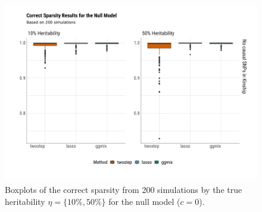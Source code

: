 \documentclass[12pt,letter]{article}\usepackage[]{graphicx}\usepackage[]{color}
\newenvironment{knitrout}{}{} %
\begin{document}
\begin{knitrout}\scriptsize
{}\color{fgcolor}\begin{figure}[h]

{\centering \includegraphics[width=1\linewidth]{figure/plot-correct-sparsity-sim-null-model-1} 

}

\caption[Boxplots of the correct sparsity from 200 simulations by the true heritability $\eta = \lbrace 10\%, 50\% \rbrace$ for the null model ($c=0$)]{Boxplots of the correct sparsity from 200 simulations by the true heritability $\eta = \lbrace 10\%, 50\% \rbrace$ for the null model ($c=0$).}\label{fig:plot-correct-sparsity-sim-null-model}
\end{figure}


\end{knitrout}
\end{document}
